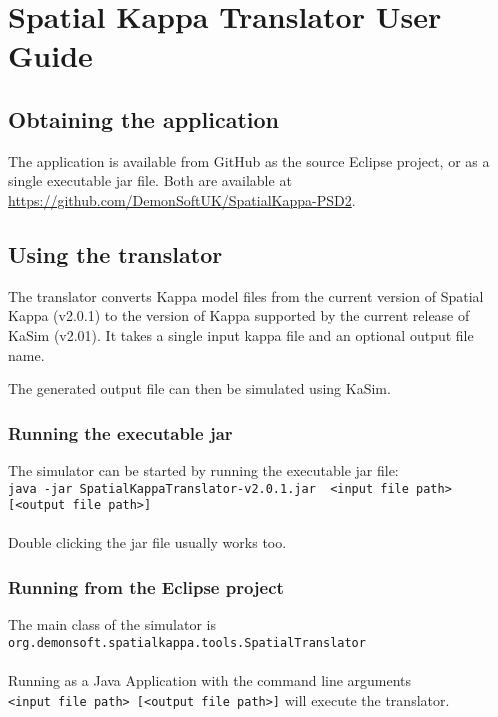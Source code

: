 \chapter{Spatial Kappa Translator User Guide}

\section{Obtaining the application}

The application is available from GitHub as the source Eclipse project, or as a single executable jar file. Both are available at \url{https://github.com/DemonSoftUK/SpatialKappa-PSD2}.

\section{Using the translator}

The translator converts Kappa model files from the current version of Spatial Kappa (v2.0.1) to the version of Kappa supported by the current release of KaSim (v2.01). It takes a single input kappa file and an optional output file name.

The generated output file can then be simulated using KaSim.

\subsection{Running the executable jar}

The simulator can be started by running the executable jar file:\\
\verb|java -jar SpatialKappaTranslator-v2.0.1.jar  <input file path> [<output file path>]|\\\\
Double clicking the jar file usually works too.

\subsection{Running from the Eclipse project}

The main class of the simulator is \\
\verb|org.demonsoft.spatialkappa.tools.SpatialTranslator|\\\\
Running as a Java Application with the command line arguments\\ \verb|<input file path> [<output file path>]| will execute the translator.

